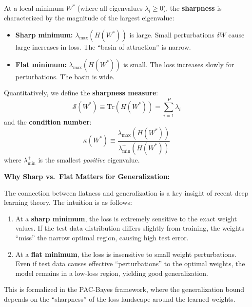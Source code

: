 \documentclass[
  journal=largetwo,
  simfonts=false,
  year=2025,
  volume=37,
]{cup-journal}
\begin{document}
\begin{definition}\label{def:sharp_flat}
At a local minimum $W^*$ (where all eigenvalues $\lambda_i \geq 0$), the \textbf{sharpness} is characterized by the magnitude of the largest eigenvalue:
\begin{itemize}
    \item \textbf{Sharp minimum:} $\lambda_{\max}(H(W^*))$ is large. Small perturbations $\delta W$ cause large increases in loss. The ``basin of attraction'' is narrow.
    \item \textbf{Flat minimum:} $\lambda_{\max}(H(W^*))$ is small. The loss increases slowly for perturbations. The basin is wide.
\end{itemize}

Quantitatively, we define the \textbf{sharpness measure}:
\begin{equation}
    \mathcal{S}(W^*) \equiv \text{Tr}(H(W^*)) = \sum_{i=1}^{P} \lambda_i
\end{equation}
and the \textbf{condition number}:
\begin{equation}
    \kappa(W^*) \equiv \frac{\lambda_{\max}(H(W^*))}{\lambda_{\min}^{+}(H(W^*))}
\end{equation}
where $\lambda_{\min}^{+}$ is the smallest \textit{positive} eigenvalue.
\end{definition}

\textbf{Why Sharp vs.\ Flat Matters for Generalization:}

The connection between flatness and generalization is a key insight of recent deep learning theory. The intuition is as follows:
\begin{enumerate}
    \item At a \textbf{sharp minimum}, the loss is extremely sensitive to the exact weight values. If the test data distribution differs slightly from training, the weights ``miss'' the narrow optimal region, causing high test error.
    
    \item At a \textbf{flat minimum}, the loss is insensitive to small weight perturbations. Even if test data causes effective ``perturbations'' to the optimal weights, the model remains in a low-loss region, yielding good generalization.
\end{enumerate}

This is formalized in the PAC-Bayes framework, where the generalization bound depends on the ``sharpness'' of the loss landscape around the learned weights.
\end{document}
